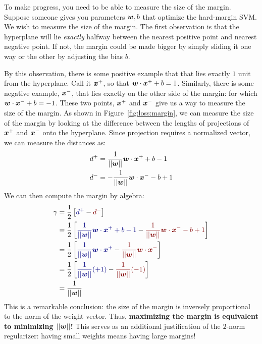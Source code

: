 To make progress, you need to be able to measure the size of the
margin.  Suppose someone gives you parameters ${\boldsymbol{w}},b$ that optimize
the hard-margin SVM.  We wish to measure the size of the margin.  The
first observation is that the hyperplane will lie \emph{exactly}
halfway between the nearest positive point and nearest negative point.
If not, the margin could be made bigger by simply sliding it one way
or the other by adjusting the bias $b$.


By this observation, there is some positive example that that lies
exactly $1$ unit from the hyperplane.  Call it ${\boldsymbol{x}}^+$, so that
${\boldsymbol{w}} \cdot {\boldsymbol{x}}^++b = 1$.  Similarly, there is some negative example,
${\boldsymbol{x}}^-$, that lies exactly on the other side of the margin: for which
${\boldsymbol{w}} \cdot {\boldsymbol{x}}^-+b = -1$.  These two points, ${\boldsymbol{x}}^+$ and ${\boldsymbol{x}}^-$ give
us a way to measure the size of the margin.  As shown in
Figure~\ref{fig:loss:margin}, we can measure the size of the margin by
looking at the difference between the lengths of projections of
${\boldsymbol{x}}^+$ and ${\boldsymbol{x}}^-$ onto the hyperplane.  Since projection requires a
normalized vector, we can measure the distances as:
%
\begin{align}
d^+ &= \frac 1 {\left\vert\left\vert {\boldsymbol{w}} \right\vert\right\vert} {\boldsymbol{w}} \cdot {\boldsymbol{x}}^+ + b - 1 \\
d^- &= - \frac 1 {\left\vert\left\vert {\boldsymbol{w}} \right\vert\right\vert} {\boldsymbol{w}} \cdot {\boldsymbol{x}}^- - b + 1
\end{align}
%
We can then compute the margin by algebra:
%
\begin{align}
\ga
&= \frac 1 2 \left[ \textcolor{darkblue}{d^+} 
                  - \textcolor{darkred}{d^-} \right] \\
&= \frac 1 2
   \left[
   \textcolor{darkblue}{\frac 1 {\norm{\vw}} \dotp{\vw}{\vx^+} + b - 1}
 - \textcolor{darkred}{\frac 1 {\norm{\vw}} \dotp{\vw}{\vx^-} - b + 1}
   \right]
\\
&= \frac 1 2 \left[
   \textcolor{darkblue}{\frac 1 {\norm{\vw}} \dotp{\vw}{\vx^+}}
 - \textcolor{darkred}{\frac 1 {\norm{\vw}} \dotp{\vw}{\vx^-}}
 \right]
\\
&= \frac 1 2 \left[
   \textcolor{darkblue}{\frac 1 {\norm{\vw}} (+1) }
 - \textcolor{darkred}{\frac 1 {\norm{\vw}} (-1) }
 \right]
\\
&= \frac 1 {\norm{\vw}}
\end{align}
%
This is a remarkable conclusion: the size of the margin is inversely
proportional to the norm of the weight vector.  Thus, {\bf maximizing
  the margin is equivalent to minimizing $\left\vert\left\vert {\boldsymbol{w}} \right\vert\right\vert$!}  This serves
as an additional justification of the $2$-norm regularizer: having
small weights means having large margins!

